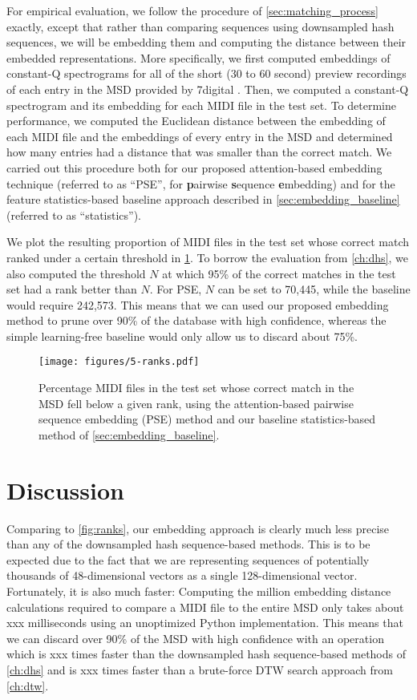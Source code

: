 For empirical evaluation, we follow the procedure of \cref{sec:matching_process} exactly, except that rather than comparing sequences using downsampled hash sequences, we will be embedding them and computing the distance between their embedded representations.
More specifically, we first computed embeddings of constant-Q spectrograms for all of the short (30 to 60 second) preview recordings of each entry in the MSD provided by 7digital \cite{schindler2012facilitating}.
Then, we computed a constant-Q spectrogram and its embedding for each MIDI file in the test set.
To determine performance, we computed the Euclidean distance between the embedding of each MIDI file and the embeddings of every entry in the MSD and determined how many entries had a distance that was smaller than the correct match.
We carried out this procedure both for our proposed attention-based embedding technique (referred to as ``PSE'', for \textbf{p}airwise \textbf{s}equence \textbf{e}mbedding) and for the feature statistics-based baseline approach described in \cref{sec:embedding_baseline} (referred to as ``statistics'').

We plot the resulting proportion of MIDI files in the test set whose correct match ranked under a certain threshold in \cref{fig:embedding_ranks}.
To borrow the evaluation from \cref{ch:dhs}, we also computed the threshold $N$ at which 95\% of the correct matches in the test set had a rank better than $N$.
For PSE, $N$ can be set to 70,445, while the baseline would require 242,573.
This means that we can used our proposed embedding method to prune over 90\% of the database with high confidence, whereas the simple learning-free baseline would only allow us to discard about 75\%.

\begin{figure}
  \texttt{[image: figures/5-ranks.pdf]}
  \caption[Percentage of the test set below a given rank]{Percentage MIDI files in the test set whose correct match in the MSD fell below a given rank, using the attention-based pairwise sequence embedding (PSE) method and our baseline statistics-based method of \cref{sec:embedding_baseline}.}
  \label{fig:embedding_ranks}
\end{figure}

\section{Discussion}
\label{sec:pse_discussion}

Comparing to \cref{fig:ranks}, our embedding approach is clearly much less precise than any of the downsampled hash sequence-based methods.
This is to be expected due to the fact that we are representing sequences of potentially thousands of 48-dimensional vectors as a single 128-dimensional vector.
Fortunately, it is also much faster: Computing the million embedding distance calculations required to compare a MIDI file to the entire MSD only takes about xxx milliseconds using an unoptimized Python implementation.
This means that we can discard over 90\% of the MSD with high confidence with an operation which is xxx times faster than the downsampled hash sequence-based methods of \cref{ch:dhs} and is xxx times faster than a brute-force DTW search approach from \cref{ch:dtw}.

